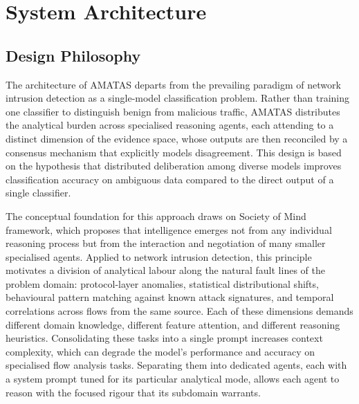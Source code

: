 \documentclass[../main.tex]{subfiles}
\begin{document}
\chapter{System Architecture}
\label{ch:architecture}

\section{Design Philosophy}
\label{sec:design-philosophy}

The architecture of AMATAS departs from the prevailing paradigm of network intrusion detection as a single-model classification problem. Rather than training one classifier to distinguish benign from malicious traffic, AMATAS distributes the analytical burden across specialised reasoning agents, each attending to a distinct dimension of the evidence space, whose outputs are then reconciled by a consensus mechanism that explicitly models disagreement. This design is based on the hypothesis that distributed deliberation among diverse models improves classification accuracy on ambiguous data compared to the direct output of a single classifier.

The conceptual foundation for this approach draws on \textcite{Minsky1986} Society of Mind framework, which proposes that intelligence emerges not from any individual reasoning process but from the interaction and negotiation of many smaller specialised agents. Applied to network intrusion detection, this principle motivates a division of analytical labour along the natural fault lines of the problem domain: protocol-layer anomalies, statistical distributional shifts, behavioural pattern matching against known attack signatures, and temporal correlations across flows from the same source. Each of these dimensions demands different domain knowledge, different feature attention, and different reasoning heuristics. Consolidating these tasks into a single prompt increases context complexity, which can degrade the model's performance and accuracy on specialised flow analysis tasks. Separating them into dedicated agents, each with a system prompt tuned for its particular analytical mode, allows each agent to reason with the focused rigour that its subdomain warrants.
\end{document}
